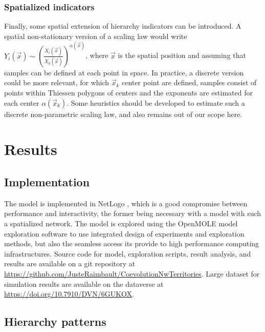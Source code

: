 \documentclass[english,fleqn,allpages]{ISTE_science}[2018/07/30]
\begin{document}
\subsubsection{Spatialized indicators}

Finally, some spatial extension of hierarchy indicators can be introduced. A spatial non-stationary version of a scaling law would write $Y_i (\vec{x}) \sim \left(\frac{X_i(\vec{x})}{X_0 (\vec{x})}\right)^{\alpha (\vec{x})}$, where $\vec{x}$ is the spatial position and assuming that samples can be defined at each point in space. In practice, a discrete version could be more relevant, for which $\vec{x}_k$ center point are defined, samples consist of points within Thiessen polygons of centers and the exponents are estimated for each center $\alpha (\vec{x}_k)$. Some heuristics should be developed to estimate such a discrete non-parametric scaling law, and also remains out of our scope here.



\section{Results}


\subsection{Implementation}

The model is implemented in NetLogo \cite{tisue2004netlogo}, which is a good compromise between performance and interactivity, the former being necessary with a model with such a spatialized network. The model is explored using the OpenMOLE model exploration software \cite{reuillon2013openmole} to use integrated design of experiments and exploration methods, but also the seamless access its provide to high performance computing infrastructures. Source code for model, exploration scripts, result analysis, and results are available on a git repository at \url{https://github.com/JusteRaimbault/CoevolutionNwTerritories}. Large dataset for simulation results are available on the dataverse at \url{https://doi.org/10.7910/DVN/6GUKOX}.


\subsection{Hierarchy patterns}

\end{document}
